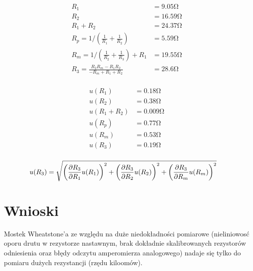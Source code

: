 \documentclass[12pt]{article}
\begin{document}
\noindent
\begin{minipage}[t]{.45\textwidth}
\begin{align*}
R_1 &= 9.05 \si{\ohm}\\
R_2 &= 16.59 \si{\ohm}\\
R_1 + R_2 &= 24.37 \si{\ohm}\\
R_p =1/\left(\frac{1}{R_1} + \frac{1}{R_2}\right) &= 5.59 \si{\ohm}\\
R_m = 1/\left(\frac{1}{R_2} + \frac{1}{R_3}\right) + R_1 &= 19.55 \si{\ohm}\\
R_3 = \frac{R_2 R_m-R_1 R_2}{-R_m+R_1+R_2} &= 28.6 \si{\ohm}\\
\end{align*}
\end{minipage}\hfill
\begin{minipage}[t]{.45\textwidth}
\begin{align*}
u(R_1) &= 0.18\si{\ohm}\\
u(R_2) &= 0.38\si{\ohm}\\
u(R_1 + R_2) &= 0.009\si{\ohm}\\
u(R_p) &= 0.77\si{\ohm}\\
u(R_m) &= 0.53\si{\ohm}\\
u(R_3) &= 0.19\si{\ohm}\\ 
\end{align*}
\end{minipage}
\begin{align*}
u(R_3) &= \small\sqrt{\left(\frac{\partial R_3}{\partial R_1}u(R_1)\right)^2 + \left(\frac{\partial R_3}{\partial R_2}u(R_2)\right)^2 + \left(\frac{\partial R_3}{\partial R_m}u(R_m)\right)^2 }
\end{align*}


\section{Wnioski}
Mostek Wheatstone'a ze względu na duże niedokładności pomiarowe (nieliniowosć oporu drutu w rezystorze nastawnym, brak dokładnie skalibrowanych rezystorów odniesienia oraz błędy odczytu amperomierza analogowego) nadaje się tylko do pomiaru dużych rezystancji (rzędu kiloomów).
\end{document}
